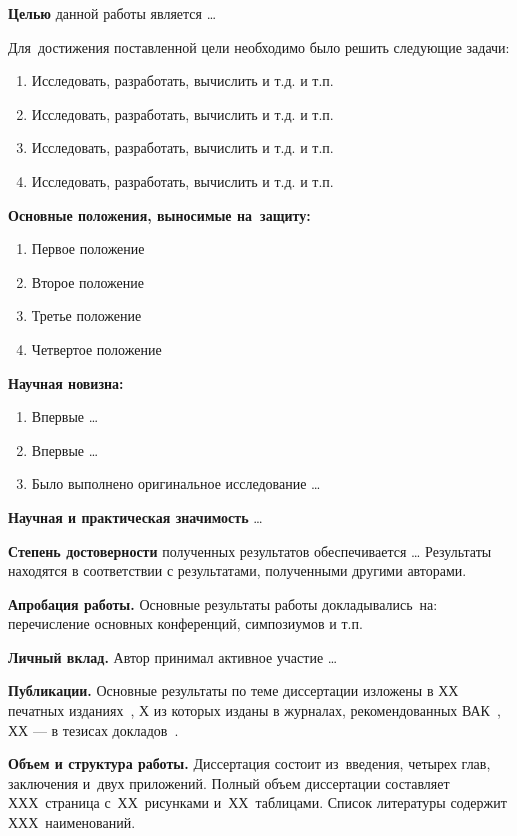 \textbf{Целью} данной работы является \ldots

Для~достижения поставленной цели необходимо было решить следующие задачи:
\begin{enumerate}
  \item Исследовать, разработать, вычислить и т.д. и т.п.
  \item Исследовать, разработать, вычислить и т.д. и т.п.
  \item Исследовать, разработать, вычислить и т.д. и т.п.
  \item Исследовать, разработать, вычислить и т.д. и т.п.
\end{enumerate}

\textbf{Основные положения, выносимые на~защиту:}
\begin{enumerate}
  \item Первое положение
  \item Второе положение
  \item Третье положение
  \item Четвертое положение
\end{enumerate}

\textbf{Научная новизна:}
\begin{enumerate}
  \item Впервые \ldots
  \item Впервые \ldots
  \item Было выполнено оригинальное исследование \ldots
\end{enumerate}

\textbf{Научная и практическая значимость} \ldots

\textbf{Степень достоверности} полученных результатов обеспечивается \ldots
Результаты находятся в соответствии с результатами, полученными другими авторами.

\textbf{Апробация работы.}
Основные результаты работы докладывались~на:
перечисление основных конференций, симпозиумов и т.п.

\textbf{Личный вклад.} Автор принимал активное участие \ldots

\textbf{Публикации.} Основные результаты по теме диссертации изложены в ХХ
печатных изданиях~\cite{bib1,bib2,bib3,bib4,bib5}, Х из которых изданы в
журналах, рекомендованных ВАК~\cite{bib1,bib2,bib3}, ХХ --- в тезисах
докладов~\cite{bib4,bib5}.

\textbf{Объем и структура работы.} Диссертация состоит из~введения, четырех
глав, заключения и~двух приложений. Полный объем диссертации составляет
ХХХ~страница с~ХХ~рисунками и~ХХ~таблицами. Список литературы содержит
ХХХ~наименований.

\clearpage